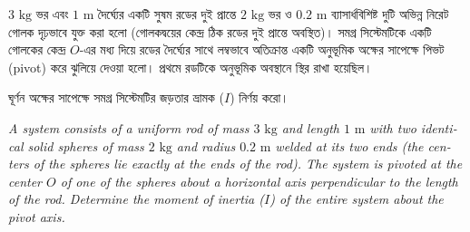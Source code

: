 \documentclass[12pt, a4paper]{article}
\begin{document}
\begin{tcolorbox}[questionbox={প্রশ্ন (Question) 3}]
\noindent
$3\text{ kg}$ ভর এবং $1\text{ m}$ দৈর্ঘ্যের একটি সুষম রডের দুই প্রান্তে $2\text{ kg}$ ভর ও $0.2\text{ m}$ ব্যাসার্ধবিশিষ্ট দুটি অভিন্ন নিরেট গোলক দৃঢ়ভাবে যুক্ত করা হলো (গোলকদ্বয়ের কেন্দ্র ঠিক রডের দুই প্রান্তে অবস্থিত)। সমগ্র সিস্টেমটিকে একটি গোলকের কেন্দ্র $O$-এর মধ্য দিয়ে রডের দৈর্ঘ্যের সাথে লম্বভাবে অতিক্রান্ত একটি অনুভূমিক অক্ষের সাপেক্ষে পিভট (pivot) করে ঝুলিয়ে দেওয়া হলো। প্রথমে রডটিকে অনুভূমিক অবস্থানে স্থির রাখা হয়েছিল।

\vspace{0.3em}
\noindent
ঘূর্ণন অক্ষের সাপেক্ষে সমগ্র সিস্টেমটির জড়তার ভ্রামক ($I$) নির্ণয় করো।

\vspace{0.8em}
\begin{english}
\noindent\textit{\color{darkgray}
A system consists of a uniform rod of mass $3\text{ kg}$ and length $1\text{ m}$ with two identical solid spheres of mass $2\text{ kg}$ and radius $0.2\text{ m}$ welded at its two ends (the centers of the spheres lie exactly at the ends of the rod). The system is pivoted at the center $O$ of one of the spheres about a horizontal axis perpendicular to the length of the rod. Determine the moment of inertia ($I$) of the entire system about the pivot axis.
}
\end{english}
\end{tcolorbox}
\end{document}
